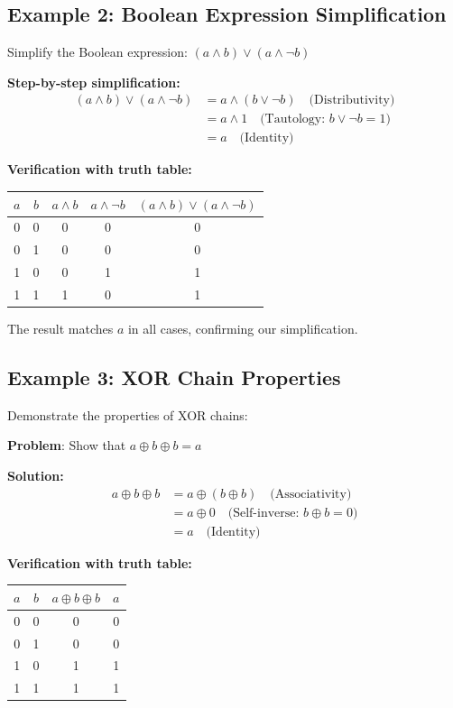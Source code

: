 \documentclass[11pt,a4paper]{article}
\begin{document}
\subsection{Example 2: Boolean Expression Simplification}

Simplify the Boolean expression: $(a \wedge b) \vee (a \wedge \neg b)$

\begin{examplebox}
\textbf{Step-by-step simplification:}
\begin{align*}
(a \wedge b) \vee (a \wedge \neg b) &= a \wedge (b \vee \neg b) \quad \text{(Distributivity)} \\
&= a \wedge 1 \quad \text{(Tautology: } b \vee \neg b = 1\text{)} \\
&= a \quad \text{(Identity)}
\end{align*}

\textbf{Verification with truth table:}
\begin{center}
\begin{tabular}{|c|c|c|c|c|}
\hline
$a$ & $b$ & $a \wedge b$ & $a \wedge \neg b$ & $(a \wedge b) \vee (a \wedge \neg b)$ \\
\hline
0 & 0 & 0 & 0 & 0 \\
0 & 1 & 0 & 0 & 0 \\
1 & 0 & 0 & 1 & 1 \\
1 & 1 & 1 & 0 & 1 \\
\hline
\end{tabular}
\end{center}

The result matches $a$ in all cases, confirming our simplification.
\end{examplebox}

\subsection{Example 3: XOR Chain Properties}

Demonstrate the properties of XOR chains:

\begin{examplebox}
\textbf{Problem}: Show that $a \oplus b \oplus b = a$

\textbf{Solution:}
\begin{align*}
a \oplus b \oplus b &= a \oplus (b \oplus b) \quad \text{(Associativity)} \\
&= a \oplus 0 \quad \text{(Self-inverse: } b \oplus b = 0\text{)} \\
&= a \quad \text{(Identity)}
\end{align*}

\textbf{Verification with truth table:}
\begin{center}
\begin{tabular}{|c|c|c|c|}
\hline
$a$ & $b$ & $a \oplus b \oplus b$ & $a$ \\
\hline
0 & 0 & 0 & 0 \\
0 & 1 & 0 & 0 \\
1 & 0 & 1 & 1 \\
1 & 1 & 1 & 1 \\
\hline
\end{tabular}
\end{center}
\end{examplebox}
\end{document}
